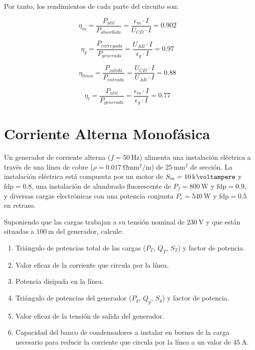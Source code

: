 \documentclass[10pt]{article}
\begin{document}
Por tanto, los rendimientos de cada parte del circuito son:

\[
  \eta_m = \frac{P_{util}}{P_{absorbida}} = \frac{\epsilon_m \cdot I}{U_{CD} \cdot I} = 0.902
\]

\[
  \eta_g = \frac{P_{entregada}}{P_{generada}} = \frac{U_{AB} \cdot I}{\epsilon_g \cdot I} = 0.97
\]

\[
  \eta_{linea} = \frac{P_{salida}}{P_{entrada}} = \frac{U_{CD} \cdot I}{U_{AB} \cdot I} = 0.88
\]

\[
  \eta_t = \frac{P_{util}}{P_{generada}} = \frac{\epsilon_m \cdot I}{\epsilon_g \cdot I} = 0.77
\]

\clearpage

\section*{Corriente Alterna Monofásica}

Un generador de corriente alterna ($f = \SI{50}{\hertz}$) alimenta una instalación eléctrica a través de una línea de cobre ($\rho = \SI{0.017}{\ohm\milli\meter\squared\per\meter}$) de $\SI{25}{\milli\meter\squared}$ de sección. La instalación eléctrica está compuesta por un motor de $S_m = \SI{10}{\kilo\voltampere}$ y $\mathrm{fdp} = 0.8$, una instalación de alumbrado fluorescente de $P_f = \SI{800}{\watt}$ y $\mathrm{fdp} = 0.9$, y diversas cargas electrónicas con una potencia conjunta $P_e = \SI{540}{\watt}$ y $\mathrm{fdp} = 0.5$ en retraso.

Suponiendo que las cargas trabajan a su tensión nominal de $\SI{230}{\volt}$ y que están situadas a $\SI{100}{\meter}$ del generador, calcule:

\begin{enumerate}
\item Triángulo de potencias total de las cargas ($P_T$, $Q_T$, $S_T$) y factor de potencia.
\item Valor eficaz de la corriente que circula por la línea.
\item Potencia disipada en la línea.
\item Triángulo de potencias del generador ($P_g$, $Q_g$, $S_g$) y factor de potencia.
\item Valor eficaz de la tensión de salida del generador.
\item Capacidad del banco de condensadores a instalar en bornes de la carga necesario para reducir la corriente que circula por la línea a un valor de $\SI{45}{\ampere}$.
\end{enumerate}
\end{document}
